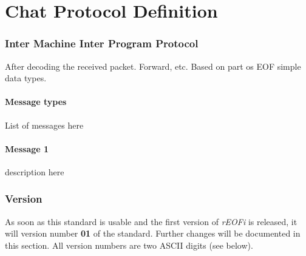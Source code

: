 \chapter{Chat Protocol Definition}
\subsection{Inter Machine Inter Program Protocol}
After decoding the received packet. Forward, etc.
Based on part os EOF simple data types.
\subsubsection{Message types}
List of messages here
\subsubsection{Message 1}
description here

\subsection{Version}
As soon as this standard is usable and the first version of \emph{rEOFi}
is released, it will version number \textbf{01} of the standard.
Further changes will be documented in this section. All version numbers
are two ASCII digits (see below).

